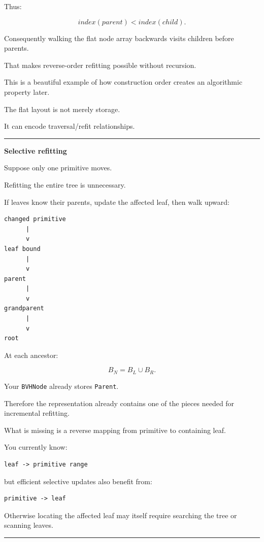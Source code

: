 Thus:

\[
index(parent)<index(child).
\]

Consequently walking the flat node array backwards visits children before parents.

That makes reverse-order refitting possible without recursion.

This is a beautiful example of how construction order creates an algorithmic property later.

The flat layout is not merely storage.

It can encode traversal/refit relationships.

\begin{center}\rule{0.5\linewidth}{0.5pt}\end{center}

\textbf{Selective refitting}

Suppose only one primitive moves.

Refitting the entire tree is unnecessary.

If leaves know their parents, update the affected leaf, then walk upward:

\begin{verbatim}
changed primitive
      |
      v
leaf bound
      |
      v
parent
      |
      v
grandparent
      |
      v
root
\end{verbatim}

At each ancestor:

\[
B_N=
B_L\cup B_R.
\]

Your \texttt{BVHNode} already stores \texttt{Parent}.

Therefore the representation already contains one of the pieces needed for incremental refitting.

What is missing is a reverse mapping from primitive to containing leaf.

You currently know:

\begin{verbatim}
leaf -> primitive range
\end{verbatim}

but efficient selective updates also benefit from:

\begin{verbatim}
primitive -> leaf
\end{verbatim}

Otherwise locating the affected leaf may itself require searching the tree or scanning leaves.

\begin{center}\rule{0.5\linewidth}{0.5pt}\end{center}

